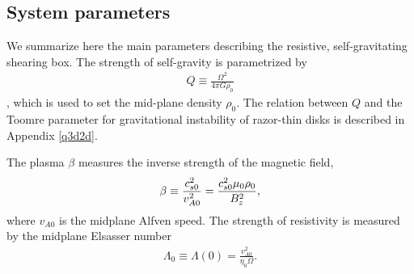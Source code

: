 \subsection{System parameters}
We summarize here the main parameters describing the resistive,
self-gravitating shearing box. The strength of self-gravity is
parametrized by 
\begin{align}
  Q \equiv \frac{\Omega^2}{4\pi G\rho_0}
\end{align}
\citep{mamat10}, which is used to set the mid-plane density $\rho_0$. 
The relation between $Q$ and the Toomre parameter for gravitational
instability of razor-thin disks is described in Appendix \ref{q3d2d}. 

The plasma $\beta$ measures the inverse strength of the  
magnetic field, 
\begin{align}
  \beta \equiv \frac{c_{s0}^2}{v_{A0}^2} =
  \frac{c_{s0}^2\mu_0\rho_0}{B_z^2},  
\end{align}
where $v_{A0}$ is the midplane Alfven speed. The strength of
resistivity is measured by the midplane Elsasser number 
\begin{align}
  \Lambda_0 \equiv\Lambda(0) =  \frac{v_{A0}^2}{\eta_0\Omega}. %
\end{align}

